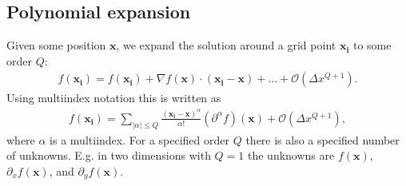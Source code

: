 \documentclass[letterpaper,10pt,english]{sphinxmanual}
\begin{document}
\subsection{Polynomial expansion}
\label{\detokenize{Utilities/LeastSquares:polynomial-expansion}}
\sphinxAtStartPar
Given some position \(\mathbf{x}\), we expand the solution around a grid point \(\mathbf{x}_{\mathbf{i}}\) to some order \(Q\):
\begin{equation*}
\begin{split}f\left(\mathbf{x}_{\mathbf{i}}\right) = f\left(\mathbf{x}_{\mathbf{i}}\right) + \nabla f\left(\mathbf{x}\right) \cdot \left(\mathbf{x}_{\mathbf{i}} - \mathbf{x}\right) + \ldots + \mathcal{O}\left(\Delta x^{Q+1}\right).\end{split}
\end{equation*}
\sphinxAtStartPar
Using multi\sphinxhyphen{}index notation this is written as
\begin{equation*}
\begin{split}f\left(\mathbf{x}_{\mathbf{i}}\right) = \sum_{|\alpha| \leq Q}\frac{\left(\mathbf{x}_{\mathbf{i}}-\mathbf{x}\right)^\alpha}{\alpha!} \left(\partial^\alpha f\right)\left(\mathbf{x}\right) + \mathcal{O}\left(\Delta x^{Q+1}\right),\end{split}
\end{equation*}
\sphinxAtStartPar
where \(\alpha\) is a multi\sphinxhyphen{}index.
For a specified order \(Q\) there is also a specified number of unknowns.
E.g. in two dimensions with \(Q = 1\) the unknowns are \(f\left(\mathbf{x}\right)\), \(\partial_x f\left(\mathbf{x}\right)\), and \(\partial_y f\left(\mathbf{x}\right)\).
\end{document}
